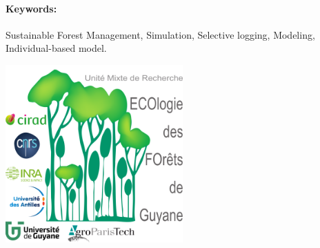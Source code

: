 {\paragraph{Keywords:}Sustainable Forest Management, Simulation, Selective logging, Modeling, Individual-based model.
}

\vspace*{\fill}
\includegraphics{images/logo}